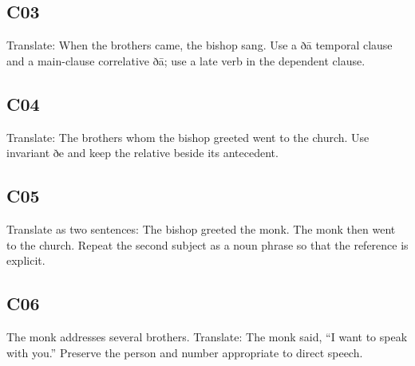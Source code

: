 \par\begin{minipage}{\linewidth}\raggedright
\subsection*{C03}

Translate: When the brothers came, the bishop sang. Use a ðā temporal clause and a main-clause correlative ðā; use a late verb in the dependent clause.

\end{minipage}\par\addvspace{4pt}

\par\begin{minipage}{\linewidth}\raggedright
\subsection*{C04}

Translate: The brothers whom the bishop greeted went to the church. Use invariant ðe and keep the relative beside its antecedent.

\end{minipage}\par\addvspace{4pt}

\par\begin{minipage}{\linewidth}\raggedright
\subsection*{C05}

Translate as two sentences: The bishop greeted the monk. The monk then went to the church. Repeat the second subject as a noun phrase so that the reference is explicit.

\end{minipage}\par\addvspace{4pt}

\par\begin{minipage}{\linewidth}\raggedright
\subsection*{C06}

The monk addresses several brothers. Translate: The monk said, “I want to speak with you.” Preserve the person and number appropriate to direct speech.

\end{minipage}\par\addvspace{4pt}

